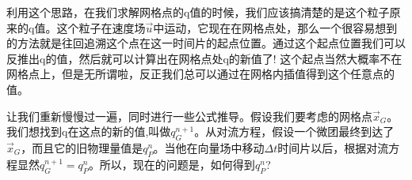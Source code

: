 \documentclass{article}
\begin{document}
\par
利用这个思路，在我们求解网格点的q值的时候，我们应该搞清楚的是这个粒子原来的q值。这个粒子在速度场$\vec{u}$中运动，它现在在网格点处，那么一个很容易想到的方法就是往回追溯这个点在这一时间片的起点位置。通过这个起点位置我们可以反推出q的值，然后就可以计算出在网格点处q的新值了! 这个起点当然大概率不在网格点上，但是无所谓啦，反正我们总可以通过在网格内插值得到这个任意点的值。
\par
让我们重新慢慢过一遍，同时进行一些公式推导。假设我们要考虑的网格点$\vec{x}_G$。我们想找到q在这点的新的值,叫做$q^{n+1}_G$。从对流方程，假设一个微团最终到达了$\vec{x}_G$，而且它的旧物理量值是$q_P^n$。当他在向量场中移动$\Delta{t}$时间片以后，根据对流方程显然$q_G^{n+1}=q_P^n$。所以，现在的问题是，如何得到$q_P^n$?
\end{document}
